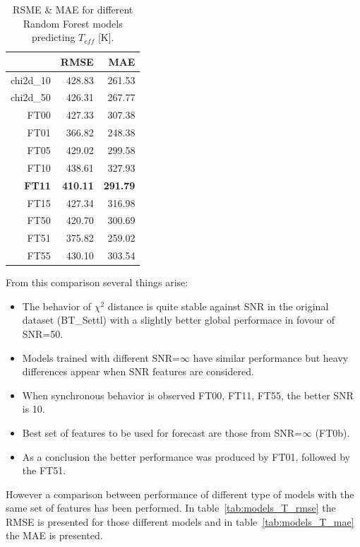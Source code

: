 \begin{table}[ht]
\centering
\begin{tabular}{rrr}
  \hline
 & RMSE & MAE \\ 
  \hline
chi2d\_10 & 428.83 & 261.53 \\ 
  chi2d\_50 & 426.31 & 267.77 \\ 
  FT00 & 427.33 & 307.38 \\ 
  FT01 & 366.82 & 248.38 \\ 
  FT05 & 429.02 & 299.58 \\ 
  FT10 & 438.61 & 327.93 \\ 
  \textbf{FT11} & \textbf{410.11} & \textbf{291.79} \\ 
  FT15 & 427.34 & 316.98 \\ 
  FT50 & 420.70 & 300.69 \\ 
  FT51 & 375.82 & 259.02 \\ 
  FT55 & 430.10 & 303.54 \\ 
   \hline
\end{tabular}
\caption { RSME \& MAE for different Random Forest models predicting $T_{eff}$ [K].} 
\label{tab:model_Tvar} 
\end{table}

From this comparison several things arise:
\begin{itemize}
 \item {The behavior of $\chi^2$ distance is quite stable against SNR 
	in the original dataset (BT\_Settl) with a slightly better global 
	performace in fovour of SNR=50.}
 \item {Models trained with different SNR=$\infty$ have similar performance but heavy 
	differences appear when SNR features are considered.}
 \item {When synchronous behavior is observed FT00, FT11, FT55, the better SNR is 10.}
 \item {Best set of features to be used for forecast are those from SNR=$\infty$ (FT0b).}
 \item {As a conclusion the better performance was produced by FT01, followed by the FT51.}
\end{itemize}

However a comparison between performance of different type of models with the same
set of features has been performed. In table~\ref{tab:models_T_rmse} the RMSE is presented for 
those different models and in table~\ref{tab:models_T_mae} the MAE is presented.


